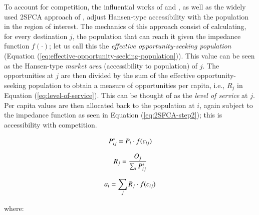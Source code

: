 \documentclass[]{elsarticle} %
\begin{document}
To account for competition, the influential works of \citet{shen1998}
and \citet{weibull_axiomatic_1976}, as well as the widely used 2SFCA
approach of \citet{luo2003}, adjust Hansen-type accessibility with the
population in the region of interest. The mechanics of this approach
consist of calculating, for every destination \(j\), the population that
can reach it given the impedance function \(f(\cdot)\); let us call this
the \emph{effective opportunity-seeking population} (Equation
(\ref{eq:effective-opportunity-seeking-population})). This value can be
seen as the Hansen-type \emph{market area} (accessibility to population)
of \(j\). The opportunities at \(j\) are then divided by the sum of the
effective opportunity-seeking population to obtain a measure of
opportunities per capita, i.e., \(R_j\) in Equation
(\ref{eq:level-of-service}). This can be thought of as the \emph{level
of service} at \(j\). Per capita values are then allocated back to the
population at \(i\), again subject to the impedance function as seen in
Equation (\ref{eq:2SFCA-step2}); this is accessibility with competition.

\begin{equation}
\label{eq:effective-opportunity-seeking-population}
P_{ij}^* = P_{i} \cdot f(c_{ij})\\
\end{equation}

\begin{equation}
\label{eq:level-of-service}
R_{j} = \frac{O_{j}}{\sum_i P_{ij}^*}\\
\end{equation}

\begin{equation}
\label{eq:2SFCA-step2}
a_{i} = {\sum_j R_{j} \cdot f(c_{ij})}\\
\end{equation}

\noindent where:
\end{document}
